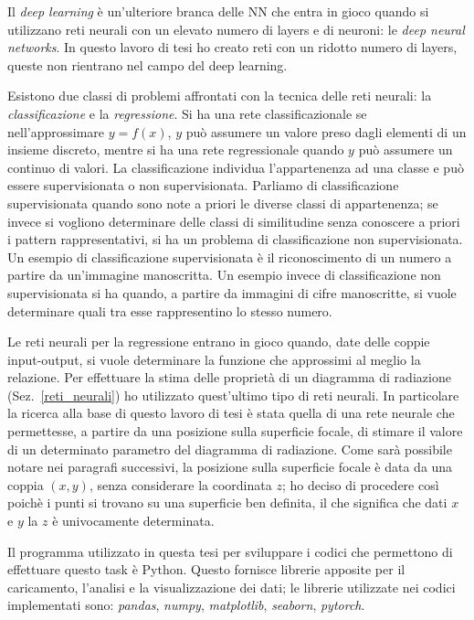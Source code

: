\documentclass[12pt,a4paper,final]{book}
\begin{document}
Il \textit{deep learning} è un'ulteriore branca delle NN che entra in gioco quando si utilizzano reti neurali con un elevato numero di layers e di neuroni: le \textit{deep neural networks}. In questo lavoro di tesi ho creato reti con un ridotto numero di layers, queste non rientrano nel campo del deep learning.


Esistono due classi di problemi affrontati con la tecnica delle reti neurali: la \textit{classificazione} e la \textit{regressione}.
Si ha una rete classificazionale se nell'approssimare $y=f(x)$, $y$ può assumere un valore preso dagli elementi di un insieme discreto, mentre si ha una rete regressionale quando $y$ può assumere un continuo di valori.
La classificazione individua l'appartenenza ad una classe e può essere supervisionata o non supervisionata. Parliamo di classificazione supervisionata quando sono note a priori le diverse classi di appartenenza; se invece si vogliono determinare delle classi di similitudine senza conoscere a priori i pattern rappresentativi, si ha un problema di classificazione non supervisionata.
Un esempio di classificazione supervisionata è il riconoscimento di un numero a partire da un'immagine manoscritta. Un esempio invece di classificazione non supervisionata si ha quando, a partire da immagini di cifre manoscritte, si vuole determinare quali tra esse rappresentino lo stesso numero.


Le reti neurali per la regressione entrano in gioco quando, date delle coppie input-output, si vuole determinare la funzione che approssimi al meglio la relazione. Per effettuare la stima delle proprietà di un diagramma di radiazione (Sez.~\ref{reti_neurali}) ho utilizzato quest'ultimo tipo di reti neurali. In particolare la ricerca alla base di questo lavoro di tesi è stata quella di una rete neurale che permettesse, a partire da una posizione sulla superficie focale, di stimare il valore di un determinato parametro del diagramma di radiazione. Come sarà possibile notare nei paragrafi successivi, la posizione sulla superficie focale è data da una coppia $(x, y)$, senza considerare la coordinata $z$; ho deciso di procedere così poichè i punti si trovano su una superficie ben definita, il che significa che dati $x$ e $y$ la $z$ è univocamente determinata.


Il programma utilizzato in questa tesi per sviluppare i codici che permettono di effettuare questo task è Python. Questo fornisce librerie apposite per il caricamento, l'analisi e la visualizzazione dei dati; le librerie utilizzate nei codici implementati sono: \textit{pandas}, \textit{numpy}, \textit{matplotlib}, \textit{seaborn}, \textit{pytorch}.
\end{document}
